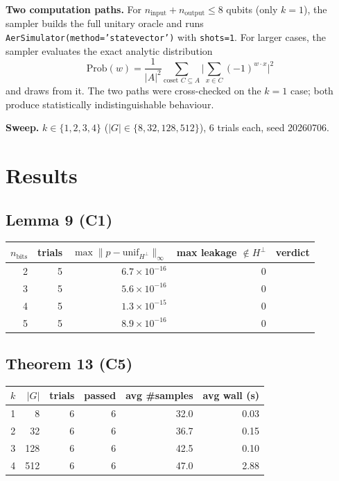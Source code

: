 \documentclass[11pt]{article}
\begin{document}
\textbf{Two computation paths.} For $n_\text{input} + n_\text{output} \le 8$
qubits (only $k=1$), the sampler builds the full unitary oracle and runs
\texttt{AerSimulator(method='statevector')} with \texttt{shots=1}. For
larger cases, the sampler evaluates the exact analytic distribution
\[
  \mathrm{Prob}(w) = \frac{1}{|A|^2}
    \sum_{\text{coset } C \subseteq A}
    \Big| \sum_{x \in C} (-1)^{w \cdot x} \Big|^2
\]
and draws from it. The two paths were cross-checked on the $k=1$ case; both
produce statistically indistinguishable behaviour.

\textbf{Sweep.} $k \in \{1,2,3,4\}$ ($|G| \in \{8, 32, 128, 512\}$),
6 trials each, seed 20260706.

\section{Results}

\subsection{Lemma 9 (C1)}

\begin{center}
\begin{tabular}{@{}rrrrr@{}}
\toprule
$n_\text{bits}$ & trials & $\max\lVert p - \text{unif}_{H^\perp}\rVert_\infty$ & max leakage $\notin H^\perp$ & verdict \\
\midrule
2 & 5 & $6.7\times10^{-16}$ & 0 & \color{green!50!black}{PASS} \\
3 & 5 & $5.6\times10^{-16}$ & 0 & \color{green!50!black}{PASS} \\
4 & 5 & $1.3\times10^{-15}$ & 0 & \color{green!50!black}{PASS} \\
5 & 5 & $8.9\times10^{-16}$ & 0 & \color{green!50!black}{PASS} \\
\bottomrule
\end{tabular}
\end{center}

\subsection{Theorem 13 (C5)}

\begin{center}
\begin{tabular}{@{}rrrrrr@{}}
\toprule
$k$ & $|G|$ & trials & passed & avg \#samples & avg wall (s) \\
\midrule
1 & 8 & 6 & 6 & 32.0 & 0.03 \\
2 & 32 & 6 & 6 & 36.7 & 0.15 \\
3 & 128 & 6 & 6 & 42.5 & 0.10 \\
4 & 512 & 6 & 6 & 47.0 & 2.88 \\
\bottomrule
\end{tabular}
\end{center}
\end{document}
